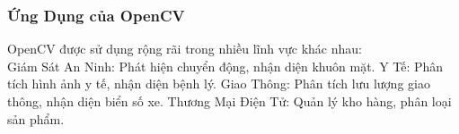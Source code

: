 \begin{flushleft}
    \subsubsection{Ứng Dụng của OpenCV}
    OpenCV được sử dụng rộng rãi trong nhiều lĩnh vực khác nhau: \\
    Giám Sát An Ninh: Phát hiện chuyển động, nhận diện khuôn mặt.
    Y Tế: Phân tích hình ảnh y tế, nhận diện bệnh lý.
    Giao Thông: Phân tích lưu lượng giao thông, nhận diện biển số xe.
    Thương Mại Điện Tử: Quản lý kho hàng, phân loại sản phẩm.


\end{flushleft}

